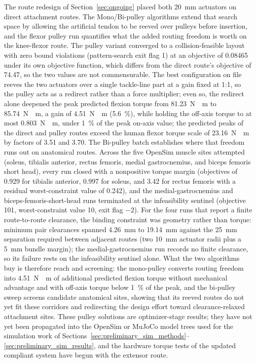 The route redesign of Section~\ref{sec:ongoing} placed both \qty{20}{\mm} actuators on direct attachment routes. The Mono/Bi-pulley algorithms extend that search space by allowing the artificial tendon to be reeved over pulleys before insertion, and the flexor pulley run quantifies what the added routing freedom is worth on the knee-flexor route. The pulley variant converged to a collision-feasible layout with zero bound violations (pattern-search exit flag 1) at an objective of 0.08465 under its own objective function, which differs from the direct route's objective of 74.47, so the two values are not commensurable. The best configuration on file reeves the two actuators over a single tackle-line part at a gain fixed at 1:1, so the pulley acts as a redirect rather than a force multiplier; even so, the redirect alone deepened the peak predicted flexion torque from \qty{81.23}{\newton\cdot\meter} to \qty{85.74}{\newton\cdot\meter}, a gain of \qty{4.51}{\newton\cdot\meter} (\qty{5.6}{\percent}), while holding the off-axis torque to at most \qty{0.803}{\newton\cdot\meter}, under \qty{1}{\percent} of the peak on-axis value; the predicted peaks of the direct and pulley routes exceed the human flexor torque scale of \qty{23.16}{\newton\cdot\meter} by factors of 3.51 and 3.70. The Bi-pulley batch establishes where that freedom runs out on anatomical routes. Across the five OpenSim muscle sites attempted (soleus, tibialis anterior, rectus femoris, medial gastrocnemius, and biceps femoris short head), every run closed with a nonpositive torque margin (objectives of 0.929 for tibialis anterior, 0.997 for soleus, and 3.42 for rectus femoris with a residual worst-constraint value of 0.242), and the medial-gastrocnemius and biceps-femoris-short-head runs terminated at the infeasibility sentinel (objective 101, worst-constraint value 10, exit flag $-2$). For the four runs that report a finite route-to-route clearance, the binding constraint was geometry rather than torque: minimum pair clearances spanned \qty{4.26}{\mm} to \qty{19.14}{\mm} against the \qty{25}{\mm} separation required between adjacent routes (two \qty{10}{\mm} actuator radii plus a \qty{5}{\mm} bundle margin); the medial-gastrocnemius run records no finite clearance, so its failure rests on the infeasibility sentinel alone. What the two algorithms buy is therefore reach and screening: the mono-pulley converts routing freedom into \qty{4.51}{\newton\cdot\meter} of additional predicted flexion torque without mechanical advantage and with off-axis torque below \qty{1}{\percent} of the peak, and the bi-pulley sweep screens candidate anatomical sites, showing that its reeved routes do not yet fit these corridors and redirecting the design effort toward clearance-relaxed attachment sites. These pulley solutions are optimizer-stage results; they have not yet been propagated into the OpenSim or MuJoCo model trees used for the simulation work of Sections~\ref{sec:preliminary_sim_methods}--\ref{sec:preliminary_sim_results}, and the hardware torque tests of the updated compliant system have begun with the extensor route.

